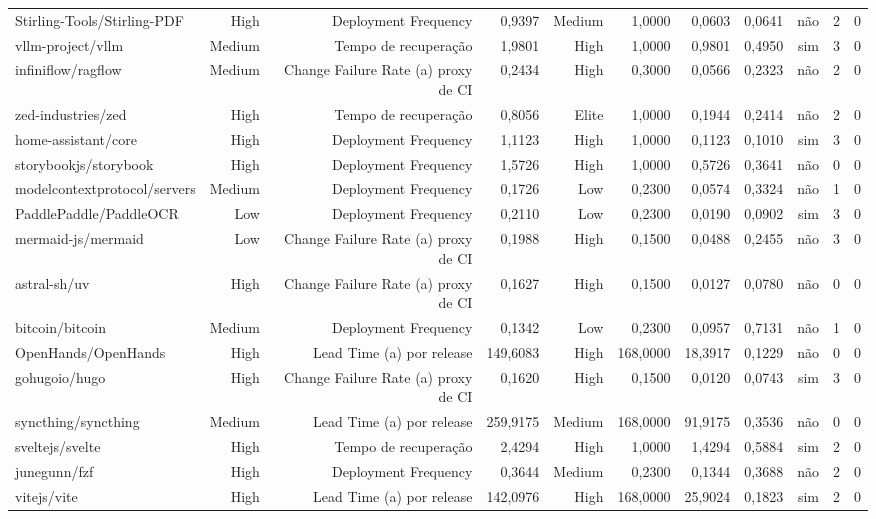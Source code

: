 \begin{tabular}{lrrrrrrrrrr}
Stirling-Tools/Stirling-PDF & High & Deployment Frequency & 0,9397 & Medium & 1,0000 & 0,0603 & 0,0641 & não & 2 & 0 \\
vllm-project/vllm & Medium & Tempo de recuperação & 1,9801 & High & 1,0000 & 0,9801 & 0,4950 & sim & 3 & 0 \\
infiniflow/ragflow & Medium & Change Failure Rate (a) proxy de CI & 0,2434 & High & 0,3000 & 0,0566 & 0,2323 & não & 2 & 0 \\
zed-industries/zed & High & Tempo de recuperação & 0,8056 & Elite & 1,0000 & 0,1944 & 0,2414 & não & 2 & 0 \\
home-assistant/core & High & Deployment Frequency & 1,1123 & High & 1,0000 & 0,1123 & 0,1010 & sim & 3 & 0 \\
storybookjs/storybook & High & Deployment Frequency & 1,5726 & High & 1,0000 & 0,5726 & 0,3641 & não & 0 & 0 \\
modelcontextprotocol/servers & Medium & Deployment Frequency & 0,1726 & Low & 0,2300 & 0,0574 & 0,3324 & não & 1 & 0 \\
PaddlePaddle/PaddleOCR & Low & Deployment Frequency & 0,2110 & Low & 0,2300 & 0,0190 & 0,0902 & sim & 3 & 0 \\
mermaid-js/mermaid & Low & Change Failure Rate (a) proxy de CI & 0,1988 & High & 0,1500 & 0,0488 & 0,2455 & não & 3 & 0 \\
astral-sh/uv & High & Change Failure Rate (a) proxy de CI & 0,1627 & High & 0,1500 & 0,0127 & 0,0780 & não & 0 & 0 \\
bitcoin/bitcoin & Medium & Deployment Frequency & 0,1342 & Low & 0,2300 & 0,0957 & 0,7131 & não & 1 & 0 \\
OpenHands/OpenHands & High & Lead Time (a) por release & 149,6083 & High & 168,0000 & 18,3917 & 0,1229 & não & 0 & 0 \\
gohugoio/hugo & High & Change Failure Rate (a) proxy de CI & 0,1620 & High & 0,1500 & 0,0120 & 0,0743 & sim & 3 & 0 \\
syncthing/syncthing & Medium & Lead Time (a) por release & 259,9175 & Medium & 168,0000 & 91,9175 & 0,3536 & não & 0 & 0 \\
sveltejs/svelte & High & Tempo de recuperação & 2,4294 & High & 1,0000 & 1,4294 & 0,5884 & sim & 2 & 0 \\
junegunn/fzf & High & Deployment Frequency & 0,3644 & Medium & 0,2300 & 0,1344 & 0,3688 & não & 2 & 0 \\
vitejs/vite & High & Lead Time (a) por release & 142,0976 & High & 168,0000 & 25,9024 & 0,1823 & sim & 2 & 0 \\

\end{tabular}
